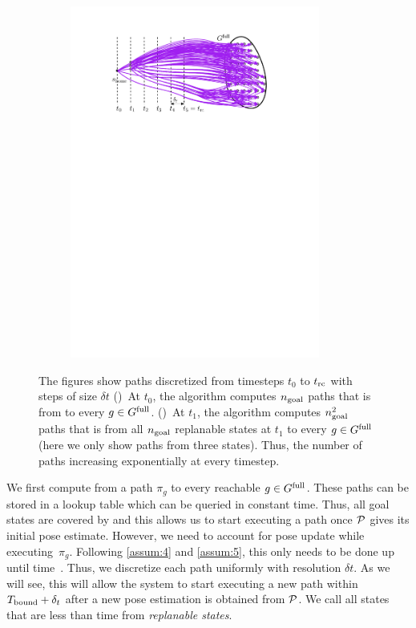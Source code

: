 \documentclass[conference]{IEEEtran}
\begin{document}
\begin{figure}[t]
\begin{subfigure}{0.225\textwidth}
        \includegraphics[width=0.9\textwidth]{naive2}
        \caption{}
        \label{fig:naive2}
    \end{subfigure}
    \caption{
    \CaptionTextSize
    The figures show paths discretized from timesteps $t_0$ to $t_{\textrm{rc}}$ with steps of size $\delta t$
    ()~At $t_0$, the algorithm computes $n_{\rm goal}$ paths that is from \Shome to every $g \in G^{\textrm{full}}$.
    ()~At $t_1$, the algorithm computes $n_{\rm goal}^2$ paths that is from all $n_{\rm goal}$ replanable states at $t_1$ to every $g \in G^{\textrm{full}}$ (here we only show paths from three states).
    Thus, the number of paths increasing exponentially at every timestep.
    }
    \label{fig:naive}
\end{figure}

We first compute from \Shome a path $\pi_g$ to every reachable $g \in G^{\textrm{full}}$. 
These paths can be stored in a lookup table which can be queried in constant time. Thus, all goal states are covered by \Shome and this allows us to start executing a path once $\mathcal{P}$ gives its initial pose estimate.
However, we need to account for pose update while executing~$\pi_g$. 
%
Following \ref{assum:4} and \ref{assum:5}, this only needs to be done up until time~\Trc.
Thus, we discretize each path uniformly with resolution $\delta t$. As we will see, this will allow the system to start executing a new path within $T_{\textrm{bound}} + \delta_t$ after a new pose estimation is obtained from $\mathcal{P}$.
%
We call all states that are less than \Trc time from \Shome \emph{replanable states}.
\end{document}
